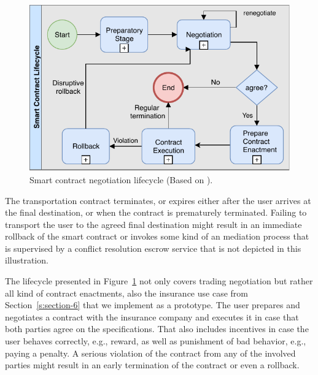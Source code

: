 \documentclass{llncs}
\begin{document}
{			\begin{figure}[H]
				\centering
				\includegraphics[scale=0.65]{Figures/smart-contract-lifecycle/20180504_smart-contract-lilfefycle.pdf}
				\caption{Smart contract negotiation lifecycle (Based on \cite{qtumWhitepaper}).}	
				\label{fig:smart-contract-lifecycle-management}
			\end{figure}			

			The transportation contract terminates, or expires either after the user arrives at the final destination, or when the contract is prematurely terminated. Failing to transport the user to the agreed final destination might result in an immediate rollback of the smart contract or invokes some kind of an mediation process that is supervised by a conflict resolution escrow service that is not depicted in this illustration.
	
			The lifecycle presented in Figure~\ref{fig:smart-contract-lifecycle-management} not only covers trading negotiation but rather all kind of contract enactments, also the insurance use case from Section~\ref{s:section-6} that we implement as a prototype. The user prepares and negotiates a contract with the insurance company and executes it in case that both parties agree on the specifications. That also includes incentives in case the user behaves correctly, e.g., reward, as well as punishment of bad behavior, e.g., paying a penalty. A serious violation of the contract from any of the involved parties might result in an early termination of the contract or even a rollback.



		
}
\end{document}
